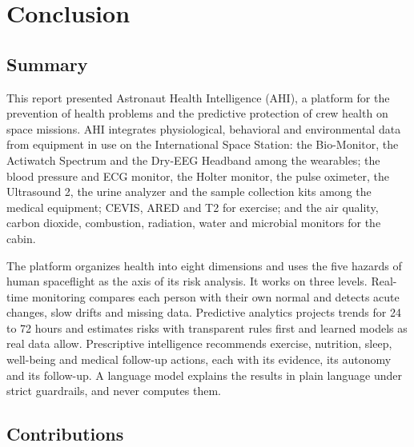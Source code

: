 \section{Conclusion}
\label{sec:conclusion}

\subsection{Summary}
\label{subsec:summary}

This report presented Astronaut Health Intelligence (AHI), a platform for the prevention of health problems and the predictive protection of crew health on space missions. AHI integrates physiological, behavioral and environmental data from equipment in use on the International Space Station: the Bio-Monitor, the Actiwatch Spectrum and the Dry-EEG Headband among the wearables; the blood pressure and ECG monitor, the Holter monitor, the pulse oximeter, the Ultrasound 2, the urine analyzer and the sample collection kits among the medical equipment; CEVIS, ARED and T2 for exercise; and the air quality, carbon dioxide, combustion, radiation, water and microbial monitors for the cabin.

The platform organizes health into eight dimensions and uses the five hazards of human spaceflight as the axis of its risk analysis. It works on three levels. Real-time monitoring compares each person with their own normal and detects acute changes, slow drifts and missing data. Predictive analytics projects trends for 24 to 72 hours and estimates risks with transparent rules first and learned models as real data allow. Prescriptive intelligence recommends exercise, nutrition, sleep, well-being and medical follow-up actions, each with its evidence, its autonomy and its follow-up. A language model explains the results in plain language under strict guardrails, and never computes them.

\subsection{Contributions}
\label{subsec:contributions}

